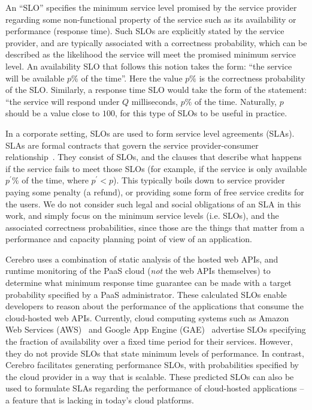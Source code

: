 An ``SLO'' specifies the minimum service level promised by the
service provider regarding some non-functional property of the service such as
its availability or performance (response time). 
Such SLOs are explicitly
stated by the service provider, and are typically associated with a correctness probability,
which can be described as the likelihood the service will meet the promised
minimum service level. An availability SLO that follows this notion
takes the form: ``the service will be available $p\%$ of the time''.
Here the value $p\%$ is the correctness probability of the SLO. Similarly, a
response time SLO would take the form of the statement: ``the service will respond 
under $Q$ milliseconds, $p\%$ of the time. Naturally, $p$ should be a value close
to $100$, for this type of SLOs to be useful in practice. 

In a corporate setting, SLOs are used to form service level agreements (SLAs).
SLAs are formal contracts that govern the service provider-consumer relationship~\cite{Keller:2003:WFS:635430.635442}.
They consist of SLOs, and the clauses that describe what happens if the
service fails to meet those SLOs (for example, if the
service is only available $p^\prime\%$ of the time, where $p^\prime < p$). This
typically boils down to service provider paying some penalty (a refund), or 
providing some form of free service credits for the users. We do not consider such
legal and social obligations of an SLA in this work, and simply focus on the
minimum service levels (i.e. SLOs), and the associated correctness probabilities, since those
are the things that matter from a performance and capacity planning point of view
of an application. 

Cerebro uses a combination of static analysis of the hosted web APIs, 
and runtime monitoring of the PaaS cloud (\textit{not} the web APIs themselves) 
to determine what minimum response time guarantee can be made 
with a target probability specified by a PaaS administrator. These calculated
SLOs enable developers to
reason about the performance of the applications that consume the cloud-hosted
web APIs.
Currently, cloud computing systems such as Amazon Web Services
(AWS)~\cite{amazon-aws-web} and
Google App Engine (GAE)~\cite{gae} advertise SLOs specifying the fraction of
availability over a fixed time period for their services.
However, they do not provide SLOs
that state minimum levels of performance.
In contrast, Cerebro facilitates generating performance SLOs, with
probabilities specified by the cloud provider in a way that is scalable. These
predicted SLOs can also be used to formulate SLAs regarding the performance of
cloud-hosted applications -- a feature that is lacking in today's cloud
platforms.

